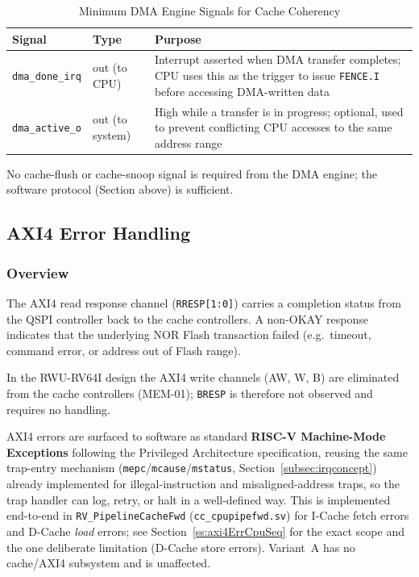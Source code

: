 \begin{table}[H]
\caption{Minimum DMA Engine Signals for Cache Coherency}
\label{tab:asDmaIf}
\centering
\begin{tabularx}{\textwidth}{|l |l |X|}
  \hline
  Signal & Type & Purpose \\
  \hline
  \hline
  \texttt{dma\_done\_irq} & out (to CPU) &
    Interrupt asserted when DMA transfer completes; CPU uses this as the
    trigger to issue \texttt{FENCE.I} before accessing DMA-written data \\
  \hline
  \texttt{dma\_active\_o} & out (to system) &
    High while a transfer is in progress; optional, used to prevent
    conflicting CPU accesses to the same address range \\
  \hline
\end{tabularx}
\end{table}

No cache-flush or cache-snoop signal is required from the DMA engine;
the software protocol (Section above) is sufficient.

\subsection{AXI4 Error Handling}
\label{subsec:axi4Error}

\subsubsection{Overview}

The AXI4 read response channel (\texttt{RRESP[1:0]}) carries a completion
status from the QSPI controller back to the cache controllers.
A non-OKAY response indicates that the underlying NOR Flash transaction
failed (e.g.\ timeout, command error, or address out of Flash range).

In the RWU-RV64I design the AXI4 write channels (AW, W, B) are eliminated
from the cache controllers (MEM-01); \texttt{BRESP} is therefore not
observed and requires no handling.

AXI4 errors are surfaced to software as standard
\textbf{RISC-V Machine-Mode Exceptions} following the Privileged
Architecture specification, reusing the same trap-entry mechanism
(\texttt{mepc}/\texttt{mcause}/\texttt{mstatus}, Section~\ref{subsec:irqconcept})
already implemented for illegal-instruction and misaligned-address traps,
so the trap handler can log, retry, or halt in a well-defined way.
This is implemented end-to-end in \texttt{RV\_PipelineCacheFwd}
(\texttt{cc\_cpupipefwd.sv}) for I-Cache fetch errors and D-Cache
\textit{load} errors; see Section~\ref{ss:axi4ErrCpuSeq} for the exact
scope and the one deliberate limitation (D-Cache store errors).
Variant~A has no cache/AXI4 subsystem and is unaffected.

